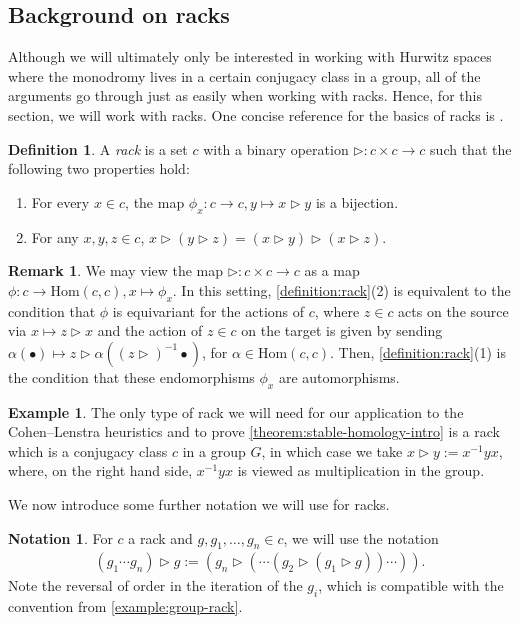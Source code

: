 \documentclass[12 pt]{amsart}
\theoremstyle{plain}
\theoremstyle{definition}
\newtheorem{definition}[theorem]{Definition}
\newtheorem{remark}[theorem]{Remark}
\newtheorem{example}[theorem]{Example}
\newtheorem{notation}[theorem]{Notation}
\theoremstyle{remark}
\numberwithin{equation}{section}
\renewcommand\hom{\mathrm{Hom}}
\begin{document}
\subsection{Background on racks}
\label{subsection:racks}
Although we will ultimately only be interested in working with Hurwitz spaces where
the monodromy lives in a certain conjugacy class in a group, all of the
arguments go through just as easily when working with racks.
Hence, for this section, we will work with racks.
One concise reference for the basics of racks is
\cite{etingof2003rack}.
\begin{definition}
	\label{definition:rack}
	A {\em rack} is a set $c$ with a binary operation $\triangleright : c \times c
	\to c$
such that the following two properties hold:
\begin{enumerate}
	\item For every $x \in c$, the map $\phi_x : c \to c, y \mapsto x
		\triangleright y$ is a bijection.
	\item For any $x,y,z \in c$, $x \triangleright (y\triangleright z) =(x\triangleright y)\triangleright
		(x\triangleright z)$.
\end{enumerate}
\end{definition}

\begin{remark}\label{remark:rackdefinition}
	We may view the map $\triangleright : c \times c \to c$ as a map $\phi: c \to
	\hom(c,c), x \mapsto \phi_x$.
	In this setting, \autoref{definition:rack}(2) is equivalent to 
	the condition that $\phi$ is equivariant for the actions of $c$, where
	$z \in c$ acts on the source via $x \mapsto z \triangleright x$ and the
	action of $z \in c$ on the target
	is given by sending $\alpha(\bullet) \mapsto z \triangleright \alpha( (z
		\triangleright)^{-1}
	\bullet)$, for $\alpha \in \hom(c,c)$.
	Then, \autoref{definition:rack}(1) is the condition that these
	endomorphisms $\phi_x$ are automorphisms.
\end{remark}

\begin{example}
	\label{example:group-rack}
	The only type of rack we will need for our application to the
	Cohen--Lenstra heuristics and to prove
	\autoref{theorem:stable-homology-intro} is a rack which is a conjugacy
	class $c$ in a group $G$, in which case we take $x \triangleright y :=
	x^{-1}yx$,
	where, on the right hand side, $x^{-1}yx$ is viewed as multiplication in the group.
\end{example}

We now introduce some further notation we will use for racks.
\begin{notation}
	\label{notation:rack-iterate}
	For $c$ a rack and $g, g_1, \ldots, g_n \in c$, we will use the notation 
	\begin{align*}
		(g_1\cdots g_n) \triangleright g := (g_n \triangleright ( \cdots (g_2 \triangleright (g_1
		\triangleright g)) \cdots )).
	\end{align*}
	Note the reversal of order in the iteration of the $g_i$, which is
	compatible 
	with the convention from \autoref{example:group-rack}.
\end{notation}
\end{document}
